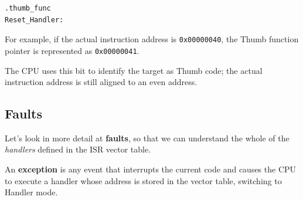 \documentclass[a4paper,11pt]{article}
\begin{document}
\begin{lstlisting}[language=arm]
.thumb_func
Reset_Handler:
\end{lstlisting}

For example, if the actual instruction address is \texttt{0x00000040}, the Thumb function pointer is represented as \texttt{0x00000041}.

The CPU uses this bit to identify the target as Thumb code; the actual
instruction address is still aligned to an even address.

\subsection{Faults}

Let's look in more detail at \textbf{faults}, so that we can understand the whole of the \textit{handlers} defined in the ISR vector table.

An \textbf{exception} is any event that interrupts the current code and
causes the CPU to execute a handler whose address is stored in the vector
table, switching to Handler mode.
\end{document}
